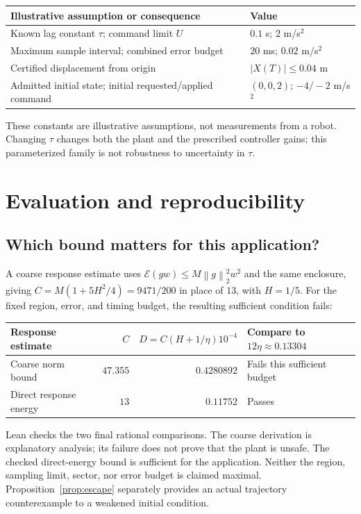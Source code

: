 \documentclass[10pt]{article}
\newcommand{\E}{\mathcal E}
\newcommand{\norm}[1]{\left\lVert#1\right\rVert}
\begin{document}
\begin{center}
\begin{tabular}{ll}
\toprule
Illustrative assumption or consequence & Value\\\midrule
Known lag constant $\tau$; command limit $U$ & $0.1$ s; $2$ m/s$^2$\\
Maximum sample interval; combined error budget & $20$ ms; $0.02$ m/s$^2$\\
Certified displacement from origin & $|X(T)|\le 0.04$ m\\
Admitted initial state; initial requested/applied command & $(0,0,2)$; $-4/-2$ m/s$^2$\\\bottomrule
\end{tabular}
\end{center}
These constants are illustrative assumptions, not measurements from a robot. Changing $\tau$ changes both the plant and the prescribed controller gains; this parameterized family is not robustness to uncertainty in $\tau$.

\section{Evaluation and reproducibility}
\subsection{Which bound matters for this application?}
A coarse response estimate uses $\E(gw)\le M\norm{g}_2^2w^2$ and the same enclosure, giving $C=M(1+5H^2/4)=9471/200$ in place of $13$, with $H=1/5$. For the fixed region, error, and timing budget, the resulting sufficient condition fails:
\begin{center}
\begin{tabular}{lrrl}
\toprule
Response estimate & $C$ & $D=C(H+1/\eta)10^{-4}$ & Compare to $12\eta\approx0.13304$\\\midrule
Coarse norm bound & $47.355$ & $0.4280892$ & Fails this sufficient budget\\
Direct response energy & $13$ & $0.11752$ & Passes\\\bottomrule
\end{tabular}
\end{center}
Lean checks the two final rational comparisons. The coarse derivation is explanatory analysis; its failure does not prove that the plant is unsafe. The checked direct-energy bound is sufficient for the application. Neither the region, sampling limit, sector, nor error budget is claimed maximal. Proposition~\ref{prop:escape} separately provides an actual trajectory counterexample to a weakened initial condition.
\end{document}
